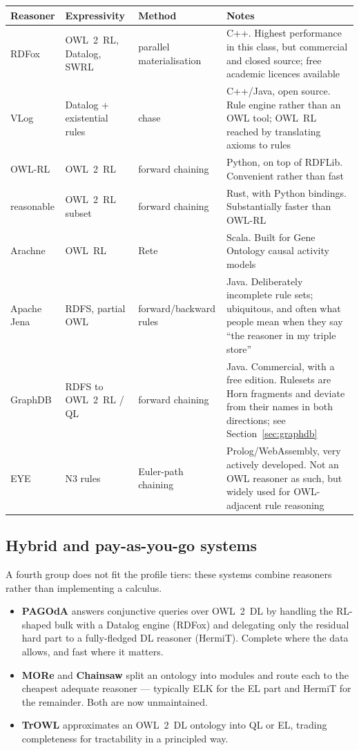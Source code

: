 \documentclass[11pt,a4paper]{article}
\begin{document}
\begin{table}[h]
\centering
\footnotesize
\begin{tabular}{@{}lllp{4.5cm}@{}}
\toprule
\textbf{Reasoner} & \textbf{Expressivity} & \textbf{Method} & \textbf{Notes}\\
\midrule
RDFox & OWL~2~RL, Datalog, SWRL & parallel materialisation
  & C++. Highest performance in this class, but commercial and closed source;
    free academic licences available\\
VLog & Datalog + existential rules & chase
  & C++/Java, open source. Rule engine rather than an OWL tool; OWL~RL reached
    by translating axioms to rules\\
OWL-RL & OWL~2~RL & forward chaining
  & Python, on top of RDFLib. Convenient rather than fast\\
reasonable & OWL~2~RL subset & forward chaining
  & Rust, with Python bindings. Substantially faster than OWL-RL\\
Arachne & OWL~RL & Rete
  & Scala. Built for Gene Ontology causal activity models\\
Apache Jena & RDFS, partial OWL & forward/backward rules
  & Java. Deliberately incomplete rule sets; ubiquitous, and often what people
    mean when they say ``the reasoner in my triple store''\\
GraphDB & RDFS to OWL~2~RL / QL & forward chaining
  & Java. Commercial, with a free edition. Rulesets are Horn fragments and
    deviate from their names in both directions; see
    Section~\ref{sec:graphdb}\\
EYE & N3 rules & Euler-path chaining
  & Prolog/WebAssembly, very actively developed. Not an OWL reasoner as such,
    but widely used for OWL-adjacent rule reasoning\\
\bottomrule
\end{tabular}
\end{table}

\subsection*{Hybrid and pay-as-you-go systems}

A fourth group does not fit the profile tiers: these systems combine reasoners
rather than implementing a calculus.

\begin{itemize}
  \item \textbf{PAGOdA} answers conjunctive queries over OWL~2~DL by handling
    the RL-shaped bulk with a Datalog engine (RDFox) and delegating only the
    residual hard part to a fully-fledged DL reasoner (HermiT). Complete where
    the data allows, and fast where it matters.
  \item \textbf{MORe} and \textbf{Chainsaw} split an ontology into modules and
    route each to the cheapest adequate reasoner --- typically ELK for the EL
    part and HermiT for the remainder. Both are now unmaintained.
  \item \textbf{TrOWL} approximates an OWL~2~DL ontology into QL or EL,
    trading completeness for tractability in a principled way.
\end{itemize}
\end{document}
